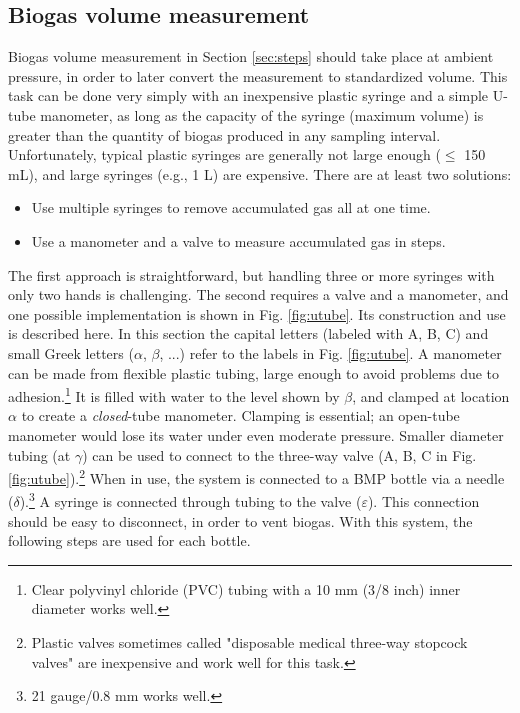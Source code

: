 \documentclass[]{article}
\begin{document}
\subsection{Biogas volume measurement}
\label{sec:volmeas}
Biogas volume measurement in Section \ref{sec:steps} should take place at ambient pressure, in order to later convert the measurement to standardized volume.
This task can be done very simply with an inexpensive plastic syringe and a simple U-tube manometer, as long as the capacity of the syringe (maximum volume) is greater than the quantity of biogas produced in any sampling interval.
Unfortunately, typical plastic syringes are generally not large enough ($\le$ 150 mL), and large syringes (e.g., 1 L) are expensive.
There are at least two solutions:
\begin{itemize}
  \item Use multiple syringes to remove accumulated gas all at one time. %
  \item Use a manometer and a valve to measure accumulated gas in steps. 
\end{itemize}

The first approach is straightforward, but handling three or more syringes with only two hands is challenging.
The second requires a valve and a manometer, and one possible implementation is shown in Fig. \ref{fig:utube}.
Its construction and use is described here.
In this section the capital letters (labeled with A, B, C) and small Greek letters ($\alpha$, $\beta$, ...) refer to the labels in Fig. \ref{fig:utube}.
A manometer can be made from flexible plastic tubing, large enough to avoid problems due to adhesion.\footnote{Clear polyvinyl chloride (PVC) tubing with a 10 mm (3/8 inch) inner diameter works well.}
It is filled with water to the level shown by $\beta$, and clamped at location $\alpha$ to create a \textit{closed}-tube manometer.
Clamping is essential; an open-tube manometer would lose its water under even moderate pressure.
Smaller diameter tubing (at $\gamma$) can be used to connect to the three-way valve (A, B, C in Fig. \ref{fig:utube}).\footnote{Plastic valves sometimes called "disposable medical three-way stopcock valves" are inexpensive and work well for this task.}
When in use, the system is connected to a BMP bottle via a needle ($\delta$).\footnote{21 gauge/0.8 mm works well.}
A syringe is connected through tubing to the valve ($\varepsilon$).
This connection should be easy to disconnect, in order to vent biogas.
With this system, the following steps are used for each bottle.
\end{document}
